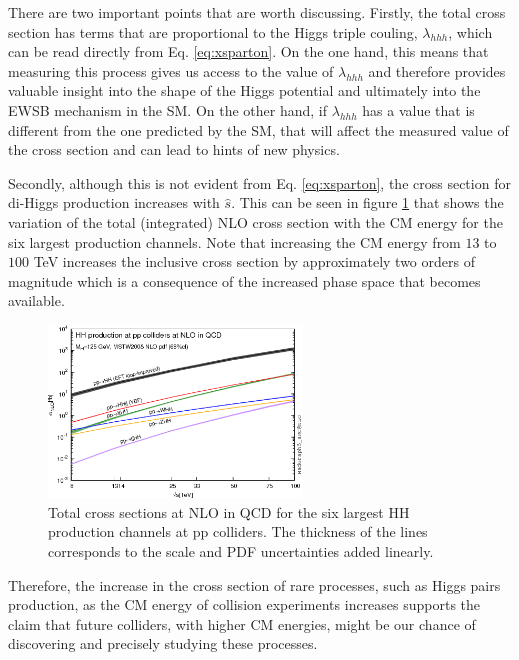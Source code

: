 There are two important points that are worth discussing. Firstly, the total cross section has terms that are proportional to the Higgs triple couling, $\lambda_{hhh}$, which can be read directly from Eq. \ref{eq:xsparton}. On the one hand, this means that measuring this process gives us access to the value of $\lambda_{hhh}$ and therefore provides valuable insight into the shape of the Higgs potential and ultimately into the EWSB mechanism in the SM. On the other hand, if $\lambda_{hhh}$ has a value that is different from the one predicted by the SM, that will affect the measured value of the cross section and can lead to hints of new physics. 

Secondly, although this is not evident from Eq. \ref{eq:xsparton}, the cross section for di-Higgs production increases with $\hat{s}$. This can be seen in figure \ref{fig:HHxs_s} that shows the variation of the total (integrated) NLO cross section with the CM energy for the six largest production channels. Note that increasing the CM energy from $13$ to $100$ TeV increases the inclusive cross section by approximately two orders of magnitude which is a consequence of the increased phase space that becomes available.

\begin{figure}[]
	\centering
	\includegraphics[width=0.6\textwidth]{./Figures/HH-xsec.png}
	\caption{Total cross sections at NLO in QCD for the six largest HH production channels at pp colliders. The thickness of the lines corresponds to the scale and PDF uncertainties added linearly.}
	\label{fig:HHxs_s}
\end{figure}

Therefore, the increase in the cross section of rare processes, such as Higgs pairs production, as the CM energy of collision experiments increases supports the claim that future colliders, with higher CM energies, might be our chance of discovering and precisely studying these processes.


